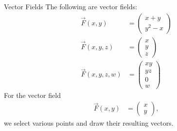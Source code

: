 \documentclass[8pt]{extarticle}
\begin{document}
  \begin{problem}{Vector Fields}
    The following are vector fields:
    \begin{align*}
      \vec{F}(x,y) &= \begin{pmatrix}x+y\\y^2-x\end{pmatrix}\\
      \vec{F}(x,y,z) &= \begin{pmatrix}x\\y\\z\end{pmatrix}\\
      \vec{F}(x,y,z,w) &= \begin{pmatrix}xy\\yz\\0\\w\end{pmatrix}
    \end{align*}
    For the vector field
    \begin{align*}
      \vec{F}(x,y) &= \begin{pmatrix}x\\y\end{pmatrix},
    \end{align*}
    we select various points and draw their resulting vectors.
    \begin{center}
    \end{center}
  \end{problem}
\end{document}
